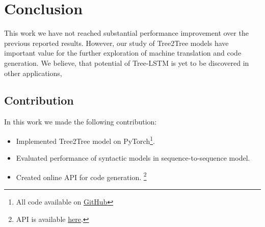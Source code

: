 \chapter{Conclusion} 

\label{Chapter6} 

This work we have not reached substantial performance improvement over the previous reported results. However, our study of Tree2Tree models have important value for the further exploration of machine translation and code generation. We believe, that potential of Tree-LSTM is yet to be discovered in other applications,

\section{Contribution}
In this work we made the following contribution:
\begin{itemize}
    \item Implemented Tree2Tree model on PyTorch\footnote{All code available on \href{https://github.com/tsdaemon/treelstm-code-generation/}{GitHub}}.
	\item Evaluated performance of syntactic models in sequence-to-sequence model.
	\item Created online API for code generation. \footnote{API is available \href{http://daemon-engineer.com/apps/codegen}{here}.}
\end{itemize}

